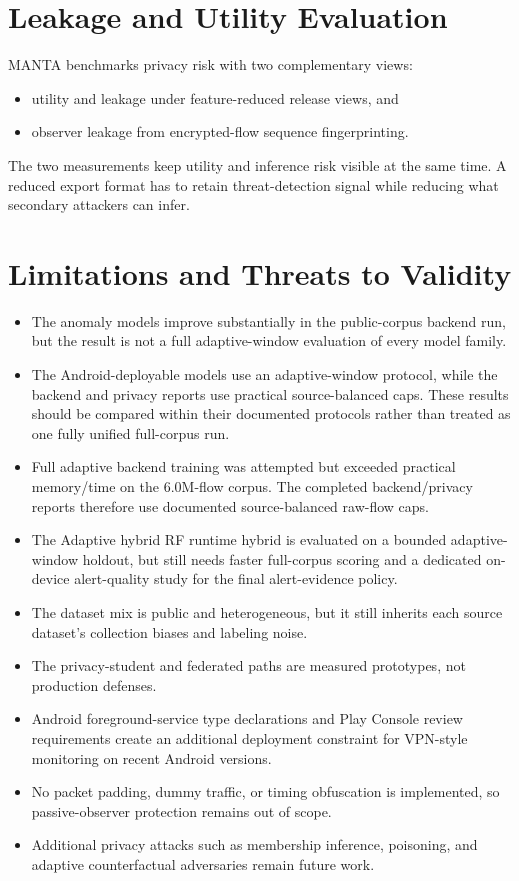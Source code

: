 \section{Leakage and Utility Evaluation}
MANTA benchmarks privacy risk with two complementary views:
\begin{itemize}[leftmargin=*]
  \item utility and leakage under feature-reduced release views, and
  \item observer leakage from encrypted-flow sequence fingerprinting.
\end{itemize}
The two measurements keep utility and inference risk visible at the same time. A reduced export
format has to retain threat-detection signal while reducing what secondary attackers can infer.

\section{Limitations and Threats to Validity}
\begin{itemize}[leftmargin=*]
  \item The anomaly models improve substantially in the public-corpus backend run, but the result is
  not a full adaptive-window evaluation of every model family.
  \item The Android-deployable models use an adaptive-window protocol, while the backend and privacy
  reports use practical source-balanced caps. These results should be compared within their
  documented protocols rather than treated as one fully unified full-corpus run.
  \item Full adaptive backend training was attempted but exceeded practical memory/time on the
  6.0M-flow corpus. The completed backend/privacy reports therefore use documented
  source-balanced raw-flow caps.
  \item The Adaptive hybrid RF runtime hybrid is evaluated on a bounded adaptive-window holdout, but
  still needs faster full-corpus scoring and a dedicated on-device alert-quality study for the final
  alert-evidence policy.
  \item The dataset mix is public and heterogeneous, but it still inherits each source dataset's
  collection biases and labeling noise.
  \item The privacy-student and federated paths are measured prototypes, not production defenses.
  \item Android foreground-service type declarations and Play Console review requirements create an
  additional deployment constraint for VPN-style monitoring on recent Android versions.
  \item No packet padding, dummy traffic, or timing obfuscation is implemented, so passive-observer
  protection remains out of scope.
  \item Additional privacy attacks such as membership inference, poisoning, and adaptive
  counterfactual adversaries remain future work.
\end{itemize}
